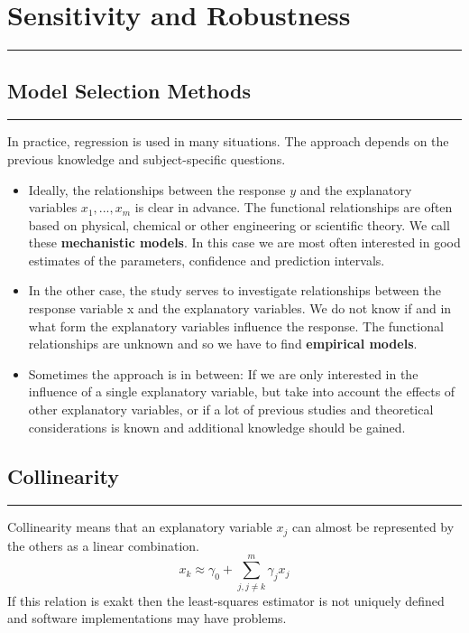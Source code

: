 \section{Sensitivity and Robustness}
\noindent\rule[\linienAbstand]{\linewidth}{\linienDickeDick}

\subsection{Model Selection Methods}
\noindent\rule[\linienAbstand]{\linewidth}{\linienDicke}
In practice, regression is used in many situations. The approach depends on the previous knowledge and subject-specific questions.\\
\begin{itemize}
  \item Ideally, the relationships between the response $y$ and the explanatory variables $x_1, ..., x_m$  is clear in advance. The functional relationships are often based on physical, chemical or other engineering or scientific theory. We call these \textbf{mechanistic models}. In this case we are most often interested in good estimates of the parameters, confidence and prediction intervals.
  \item  In the other case, the study serves to investigate relationships between the response variable x and the explanatory variables. We do not know if and in what form the explanatory variables influence the response. The functional relationships are unknown and so we have to find \textbf{empirical models}.
  \item Sometimes the approach is in between: If we are only interested in the influence of a single explanatory variable, but take into account the effects of other explanatory variables, or if a lot of previous studies and theoretical considerations is known and additional knowledge should be gained.
\end{itemize}


\subsection{Collinearity}
\noindent\rule[\linienAbstand]{\linewidth}{\linienDicke}
Collinearity means that an explanatory variable $x_j$ can almost be represented by the others as a linear combination.
\begin{equation}
  x_k \approx \gamma_0 + \sum^m_{j, j\neq k}\gamma_j x_j
\end{equation}
If this relation is exakt then the least-squares estimator is not uniquely defined and software implementations may have problems.\\

